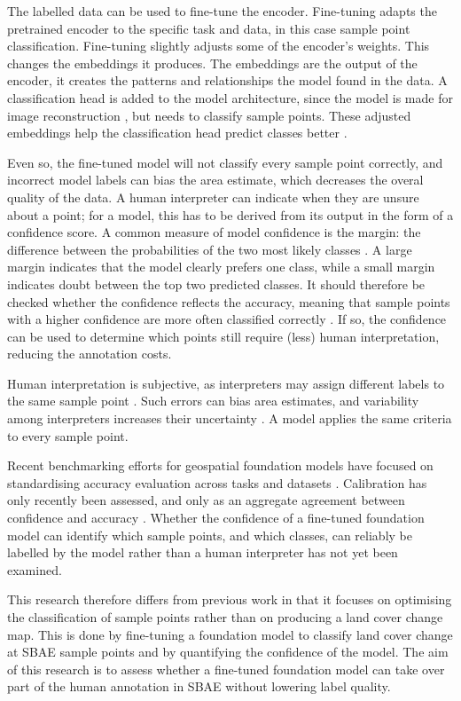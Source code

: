 \documentclass[11pt,a4paper]{report}
\begin{document}
The labelled data can be used to fine-tune the encoder. Fine-tuning adapts
the pretrained encoder to the specific task and data, in this case sample point
classification. Fine-tuning slightly adjusts some of the encoder's weights. This
changes the embeddings it produces. The embeddings are the output of the
encoder, it creates the patterns and relationships the model found in the data.
A classification head is added to the model architecture, since the model is
made for image reconstruction \parencite{szwarcman2025}, but needs to classify
sample points. These adjusted embeddings help the classification head predict
classes better \parencite{simumba2025}.

Even so, the fine-tuned model will not classify every sample point correctly,
and incorrect model labels can bias the area estimate, which decreases the overal quality of the data.
A human interpreter can indicate when they are unsure about a point; for a
model, this has to be derived from its output in the form of a confidence
score. A common measure of model confidence is the margin: the difference
between the probabilities of the two most likely classes \parencite{valle2023}.
A large margin indicates that the model clearly prefers one class, while a
small margin indicates doubt between the top two predicted classes. It should
therefore be checked whether the confidence reflects the accuracy, meaning that
sample points with a higher confidence are more often classified correctly
\parencite{geifman2017}. If so, the confidence can be used to determine which
points still require (less) human interpretation, reducing the annotation costs.

Human interpretation is subjective, as interpreters may assign different
labels to the same sample point \parencite{pengra2020, gfoi2018}. Such errors
can bias area estimates, and variability among interpreters increases their
uncertainty \parencite{mcroberts2018, jonckheere2024}. A model applies the
same criteria to every sample point.

Recent benchmarking efforts for geospatial foundation models have focused on
standardising accuracy evaluation across tasks and datasets
\parencite{simumba2025, marsocci2025}. Calibration has only recently been
assessed, and only as an aggregate agreement between confidence and accuracy
\parencite{lehmann2026}. Whether the confidence of a fine-tuned foundation model
can identify which sample points, and which classes, can reliably be labelled
by the model rather than a human interpreter has not yet been examined.

This research therefore differs from previous work in that it focuses on
optimising the classification of sample points rather than on producing a land
cover change map. This is done by fine-tuning a foundation model to classify
land cover change at SBAE sample points and by quantifying the confidence of the
model. The aim of this research is to assess whether a fine-tuned foundation model can
take over part of the human annotation in SBAE without lowering label quality.

\printbibliography
\end{document}
